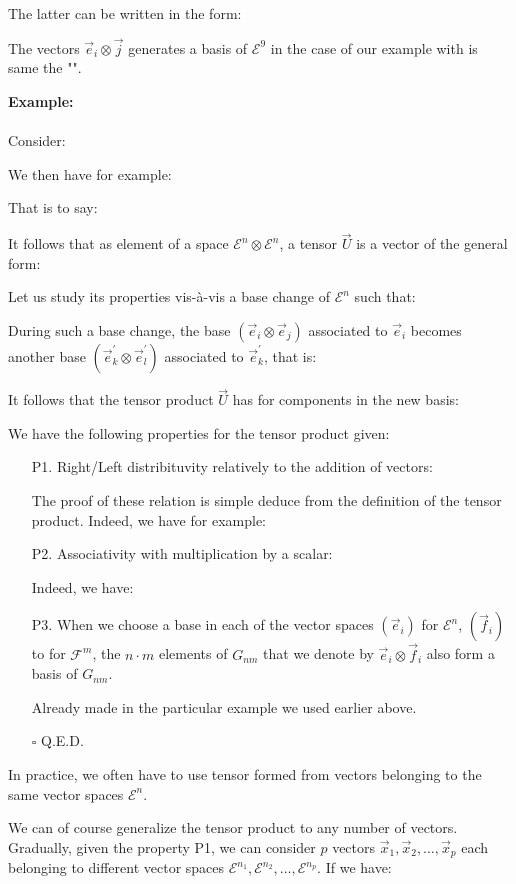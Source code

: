	The latter can be written in the form:
	
	The vectors $\vec{e}_i\otimes\vec{j}$ generates a basis of $\mathcal{E}^9$ in the case of our example with is same the "".
	\begin{tcolorbox}[colframe=black,colback=white,sharp corners]
	\textbf{{\Large {}}Example:}\\\\
	Consider:
	
	We then have for example:
	
	That is to say:
	
	\end{tcolorbox}
	It follows that as element of a space $\mathcal{E}^n\otimes \mathcal{E}^n$, a tensor $\vec{U}$ is a vector of the general form:
	
	Let us study its properties vis-à-vis a base change of $\mathcal{E}^n$ such that:
	
	During such a base change, the base $(\vec{e}_i\otimes\vec{e}_j)$ associated to $\vec{e}_i$  becomes another base $(\vec{e}_k^{'}\otimes\vec{e}_l^{'})$ associated to $\vec{e}_k^{'}$, that is:
	
	It follows that the tensor product $\vec{U}$ has for components in the new basis:
	
	We have the following properties for the tensor product given:
	
	\begin{enumerate}
		\item[P1.] Right/Left distribituvity relatively to the addition of vectors:
		
		The proof of these relation is simple deduce from the definition of the tensor product. Indeed, we have for example:
		
		
		\item[P2.] Associativity with multiplication by a scalar:
		
		Indeed, we have:
		
	
		\item[P3.] When we choose a base in each of the vector spaces $(\vec{e}_i)$ for $\mathcal{E}^n$, $(\vec{f}_i)$ to for $\mathcal{F}^m$, the $n\cdot m$ elements of $G_{nm}$ that we denote by $\vec{e}_i \otimes\vec{f}_i$ also form a basis of $G_{nm}$.
		\begin{dem}
			Already made in the particular example we used earlier above.
		\begin{flushright}
			$\square$  Q.E.D.
		\end{flushright}
		\end{dem}
	\end{enumerate}
	\begin{tcolorbox}[title=Remark,colframe=black,arc=10pt]
	In practice, we often have to use tensor formed from vectors belonging to the same vector spaces $\mathcal{E}^n$.
	\end{tcolorbox}
	We can of course generalize the tensor product to any number of vectors. Gradually, given the property P1, we can consider $p$ vectors $\vec{x}_1,\vec{x}_2,\ldots,\vec{x}_p$ each belonging to different vector spaces $\mathcal{E}^{n_1},\mathcal{E}^{n_2},\ldots,\mathcal{E}^{n_p}$. If we have:
	
